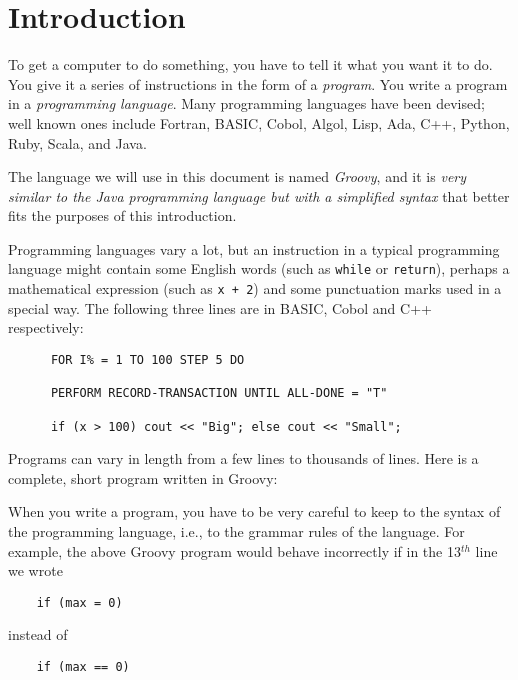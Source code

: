 \section{Introduction}


To get a computer to do something, you have to tell it what you want it
to do.  You give it a series of instructions in the form of a \emph{program}.
You write a program in a \emph{programming language}.
Many programming languages have been devised; well known ones include
Fortran, BASIC, Cobol, Algol, Lisp, Ada, C++, Python, Ruby, Scala, and Java.

The language we will use in this document is named \emph{Groovy}, and
it is \emph{very similar to the Java programming language but with a
simplified syntax} that better fits the purposes of this introduction. 

Programming languages vary a lot, but
an instruction in a typical programming language might contain
some English words (such as \verb!while! or \verb!return!), perhaps a mathematical
expression (such as \verb!x + 2!) and some punctuation marks used in a special way.
The following three lines are in BASIC, Cobol and C++ respectively:
\begin{Verbatim}
      FOR I% = 1 TO 100 STEP 5 DO

      PERFORM RECORD-TRANSACTION UNTIL ALL-DONE = "T"

      if (x > 100) cout << "Big"; else cout << "Small";
\end{Verbatim}

Programs can vary in length from a few lines to thousands of lines.
Here is a complete, short program written in Groovy:


When you write a program, you have to be very careful to keep to the
syntax of the programming language, i.e., to the grammar rules of the language.
For example, the above Groovy program would
behave incorrectly if in the 13$^{th}$ line we wrote 

\begin{Verbatim}
	if (max = 0)
\end{Verbatim}

instead of 

\begin{Verbatim}
	if (max == 0)
\end{Verbatim}

